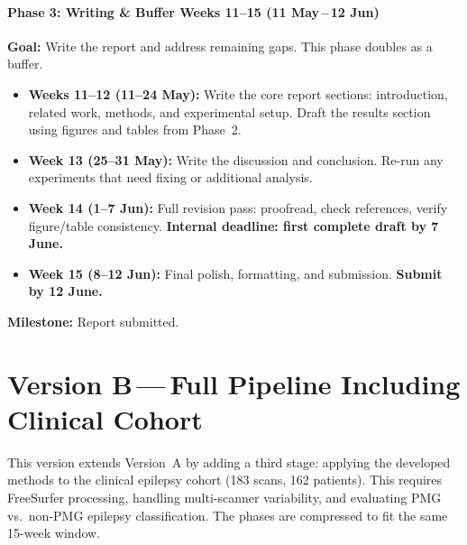 \documentclass[a4paper,11pt]{article}
\begin{document}
\subsection*{\textcolor{phase3}{Phase 3: Writing \& Buffer \hfill Weeks 11--15 {\normalfont(11 May\,--\,12 Jun)}}}

\textbf{Goal:} Write the report and address remaining gaps. This phase doubles as a buffer.

\begin{itemize}[leftmargin=*]
    \item \textbf{Weeks 11--12 (11--24 May):}
    Write the core report sections: introduction, related work, methods, and experimental setup.
    Draft the results section using figures and tables from Phase~2.

    \item \textbf{Week 13 (25--31 May):}
    Write the discussion and conclusion.
    Re-run any experiments that need fixing or additional analysis.

    \item \textbf{Week 14 (1--7 Jun):}
    Full revision pass: proofread, check references, verify figure/table consistency.
    \textbf{Internal deadline: first complete draft by 7 June.}

    \item \textbf{Week 15 (8--12 Jun):}
    Final polish, formatting, and submission.
    \textbf{Submit by 12 June.}
\end{itemize}

\noindent\textbf{Milestone:} Report submitted.


%
%

\newpage
\part*{Version B\,---\,Full Pipeline Including Clinical Cohort}

This version extends Version~A by adding a third stage: applying the developed methods to the clinical epilepsy cohort (183 scans, 162 patients). This requires FreeSurfer processing, handling multi-scanner variability, and evaluating PMG vs.\ non-PMG epilepsy classification. The phases are compressed to fit the same 15-week window.
\end{document}
